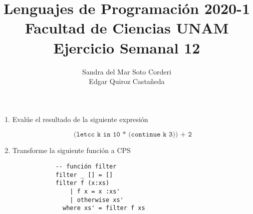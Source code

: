 \documentclass{article}
\title{
    Lenguajes de Programación 2020-1\\
    Facultad de Ciencias UNAM\\
    Ejercicio Semanal 12
}
\author{
    Sandra del Mar Soto Corderi\\
    Edgar Quiroz Castañeda
}
\newcommand{\tx}[1]{\texttt{#1}}
\begin{document}
    
    \maketitle

    \begin{enumerate}
        \item Evalúe el resultado de la siguiente expresión

        \[
            \tx{(letcc k in 10 * (continue k 3)) + 2}
        \]

        \item Transforme la siguiente función a CPS
        
        \begin{verbatim}
            -- función filter
            filter _ [] = []
            filter f (x:xs) 
                | f x = x :xs'
                | otherwise xs'
              where xs' = filter f xs
        \end{verbatim}

        
    \end{enumerate}
\end{document}
